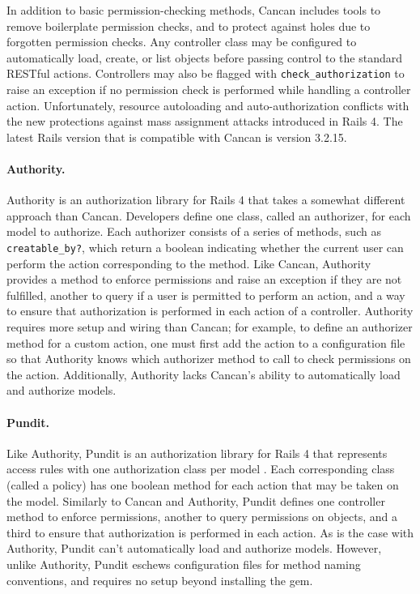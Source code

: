 \documentclass[document.tex]{subfiles}
\begin{document}
In addition to basic permission-checking methods, Cancan includes tools to remove boilerplate permission checks, and to protect against holes due to forgotten permission checks. Any controller class may be configured to automatically load, create, or list objects before passing control to the standard RESTful actions. Controllers may also be flagged with \verb!check_authorization! to raise an exception if no permission check is performed while handling a controller action. Unfortunately, resource autoloading and auto-authorization conflicts with the new protections against mass assignment attacks introduced in Rails 4. The latest Rails version that is compatible with Cancan is version 3.2.15.

\paragraph{Authority.} Authority \cite{authority} is an authorization library for Rails 4 that takes a somewhat different approach than Cancan. Developers define one class, called an authorizer, for each model to authorize. Each authorizer consists of a series of methods, such as \verb!creatable_by?!, which return a boolean indicating whether the current user can perform the action corresponding to the method. Like Cancan, Authority provides a method to enforce permissions and raise an exception if they are not fulfilled, another to query if a user is permitted to perform an action, and a way to ensure that authorization is performed in each action of a controller. Authority requires more setup and wiring than Cancan; for example, to define an authorizer method for a custom action, one must first add the action to a configuration file so that Authority knows which authorizer method to call to check permissions on the action. Additionally, Authority lacks Cancan’s ability to automatically load and authorize models.

\paragraph{Pundit.} Like Authority, Pundit is an authorization library for Rails 4 that represents access rules with one authorization class per model \cite{pundit}. Each corresponding class (called a policy) has one boolean method for each action that may be taken on the model. Similarly to Cancan and Authority, Pundit defines one controller method to enforce permissions, another to query permissions on objects, and a third to ensure that authorization is performed in each action. As is the case with Authority, Pundit can’t automatically load and authorize models. However, unlike Authority, Pundit eschews configuration files for method naming conventions, and requires no setup beyond installing the gem.
\end{document}
